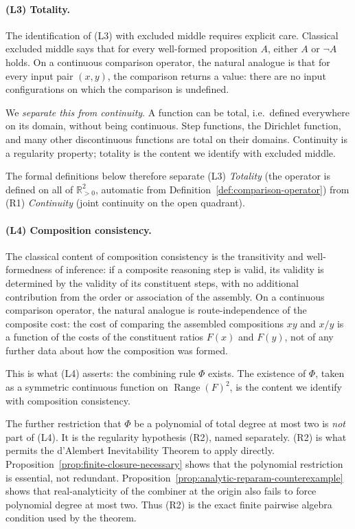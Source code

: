 \documentclass[11pt,a4paper]{article}
\theoremstyle{definition}
\theoremstyle{remark}
\begin{document}
\paragraph{(L3) Totality.} The identification of (L3) with excluded
middle requires explicit care. Classical excluded middle says that for
every well-formed proposition $A$, either $A$ or $\neg A$ holds. On a
continuous comparison operator, the natural analogue is that for every
input pair $(x, y)$, the comparison returns a value: there are no input
configurations on which the comparison is undefined.

We \emph{separate this from continuity}. A function can be total,
i.e.\ defined everywhere on its domain, without being continuous. Step functions,
the Dirichlet function, and many other discontinuous functions are total
on their domains. Continuity is a regularity property; totality is the
content we identify with excluded middle.

The formal definitions below therefore separate (L3)
\emph{Totality} (the operator is defined on all of $\mathbb{R}_{>0}^2$,
automatic from Definition~\ref{def:comparison-operator}) from (R1)
\emph{Continuity} (joint continuity on the open quadrant).

\paragraph{(L4) Composition consistency.} The classical content of
composition consistency is the transitivity and well-formedness of
inference: if a composite reasoning step is valid, its validity is
determined by the validity of its constituent steps, with no additional
contribution from the order or association of the assembly. On a
continuous comparison operator, the natural analogue is route-independence
of the composite cost: the cost of comparing the assembled compositions
$xy$ and $x/y$ is a function of the costs of the constituent ratios
$F(x)$ and $F(y)$, not of any further data about how the composition
was formed.

This is what (L4) asserts: the combining rule $\Phi$ exists. The
existence of $\Phi$, taken as a symmetric continuous function on
$\operatorname{Range}(F)^2$, is the content we identify with composition
consistency.

The further restriction that $\Phi$ be a polynomial of total degree at
most two is \emph{not} part of (L4). It is the regularity hypothesis (R2),
named separately. (R2) is what permits the
d'Alembert Inevitability Theorem to apply directly.
Proposition~\ref{prop:finite-closure-necessary} shows that the
polynomial restriction is essential, not redundant. Proposition~\ref{prop:analytic-reparam-counterexample}
shows that real-analyticity of the combiner at the origin also fails to
force polynomial degree at most two. Thus (R2) is the exact finite
pairwise algebra condition used by the theorem.
\end{document}
